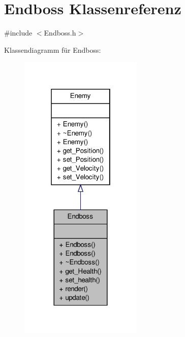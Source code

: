 \hypertarget{class_endboss}{\section{Endboss Klassenreferenz}
\label{class_endboss}
}


{\ttfamily \#include $<$Endboss.\-h$>$}



Klassendiagramm für Endboss\-:
\nopagebreak
\begin{figure}[H]
\begin{center}
\leavevmode
\includegraphics[width=166pt]{class_endboss__inherit__graph}
\end{center}
\end{figure}


